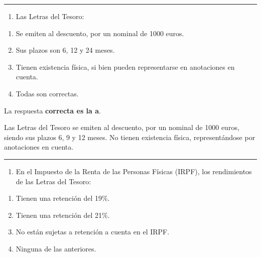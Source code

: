 \documentclass[
  letterpaper,
  DIV=11,
  numbers=noendperiod]{scrreprt}
\providecommand{\tightlist}{%
  \setlength{\itemsep}{0pt}\setlength{\parskip}{0pt}}\usepackage{longtable,booktabs,array}
\begin{document}
\begin{center}\rule{0.5\linewidth}{0.5pt}\end{center}

\begin{enumerate}
\def\labelenumi{\arabic{enumi}.}
\setcounter{enumi}{63}
\tightlist
\item
  Las Letras del Tesoro:
\end{enumerate}

\begin{enumerate}
\def\labelenumi{\alph{enumi})}
\item
  Se emiten al descuento, por un nominal de 1000 euros.
\item
  Sus plazos son 6, 12 y 24 meses.
\item
  Tienen existencia física, si bien pueden representarse en anotaciones
  en cuenta.
\item
  Todas son correctas.
\end{enumerate}

\begin{tcolorbox}[enhanced jigsaw, left=2mm, opacityback=0, colback=white, breakable, arc=.35mm, bottomrule=.15mm, rightrule=.15mm, toprule=.15mm, leftrule=.75mm, colframe=quarto-callout-tip-color-frame]
\begin{minipage}[t]{5.5mm}
\textcolor{quarto-callout-tip-color}{\faLightbulb}
\end{minipage}%
\begin{minipage}[t]{\textwidth - 5.5mm}

La respuesta \textbf{correcta es la a}.

Las Letras del Tesoro se emiten al descuento, por un nominal de 1000
euros, siendo sus plazos 6, 9 y 12 meses. No tienen existencia física,
representándose por anotaciones en cuenta.

\end{minipage}%
\end{tcolorbox}

\begin{center}\rule{0.5\linewidth}{0.5pt}\end{center}

\begin{enumerate}
\def\labelenumi{\arabic{enumi}.}
\setcounter{enumi}{64}
\tightlist
\item
  En el Impuesto de la Renta de las Personas Físicas (IRPF), los
  rendimientos de las Letras del Tesoro:
\end{enumerate}

\begin{enumerate}
\def\labelenumi{\alph{enumi})}
\item
  Tienen una retención del 19\%.
\item
  Tienen una retención del 21\%.
\item
  No están sujetas a retención a cuenta en el IRPF.
\item
  Ninguna de las anteriores.
\end{enumerate}
\end{document}
